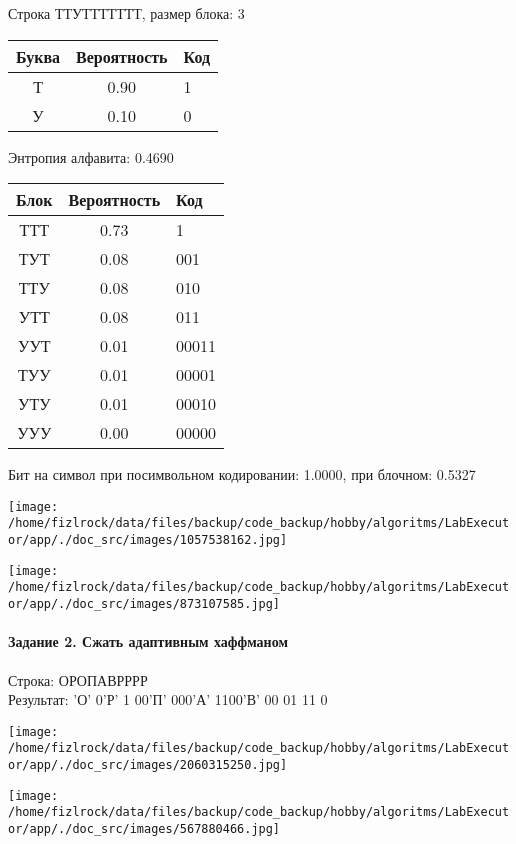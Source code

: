 \documentclass[a4paper, 12pt]{article}
\begin{document}
Строка ТТУТТТТТТТ, размер блока: 3
\begin{center}
 \begin{tabular}{ |c|c|l| } 
  \hline
     Буква & Вероятность & Код\\ \hline
Т & 0.90 & 1\\\hline
У & 0.10 & 0
\\ \hline \end{tabular}
\end{center}
Энтропия алфавита: 0.4690
\begin{center}
 \begin{tabular}{ |c|c|l| } 
  \hline
     Блок & Вероятность & Код\\ \hline
ТТТ & 0.73 & 1\\\hline
ТУТ & 0.08 & 001\\\hline
ТТУ & 0.08 & 010\\\hline
УТТ & 0.08 & 011\\\hline
УУТ & 0.01 & 00011\\\hline
ТУУ & 0.01 & 00001\\\hline
УТУ & 0.01 & 00010\\\hline
УУУ & 0.00 & 00000
\\ \hline \end{tabular}
\end{center}
Бит на символ при посимвольном кодировании: 1.0000, при блочном: 0.5327

\texttt{[image: /home/fizlrock/data/files/backup/code\_backup/hobby/algoritms/LabExecutor/app/./doc\_src/images/1057538162.jpg]}

\texttt{[image: /home/fizlrock/data/files/backup/code\_backup/hobby/algoritms/LabExecutor/app/./doc\_src/images/873107585.jpg]}
\pagebreak
\paragraph{Задание 2. Сжать адаптивным хаффманом\\}

Строка: 
ОРОПАВРРРР\\
Результат: 'О' 0'Р' 1 00'П' 000'А' 1100'В' 00 01 11 0

\texttt{[image: /home/fizlrock/data/files/backup/code\_backup/hobby/algoritms/LabExecutor/app/./doc\_src/images/2060315250.jpg]}

\texttt{[image: /home/fizlrock/data/files/backup/code\_backup/hobby/algoritms/LabExecutor/app/./doc\_src/images/567880466.jpg]}
\end{document}
